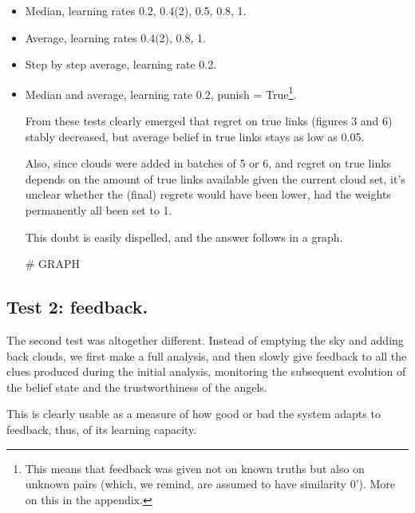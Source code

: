 \documentclass[11pt]{article}
\begin{document}
\begin{itemize}
\item Median, learning rates 0.2, 0.4(2), 0.5, 0.8, 1.

\item Average, learning rates 0.4(2), 0.8, 1.

\item Step by step average, learning rate 0.2.

\item Median and average, learning rate 0.2, punish = True\footnote{This means that feedback was given not on known truths but also on unknown pairs (which, we remind, are assumed to have similarity $0$'). More on this in the appendix.}.

From these tests clearly emerged that regret on true links (figures 3 and 6) stably decreased, but average belief in true links stays as low as 0.05.

Also, since clouds were added in batches of 5 or 6, and regret on true links depends on the amount of true links available given the current cloud set, it's unclear whether the (final) regrets would have been lower, had the weights permanently all been set to 1.

This doubt is easily dispelled, and the answer follows in a graph. 

\# GRAPH



\end{itemize}









\subsection{Test 2: feedback.}

The second test was altogether different. Instead of emptying the sky and adding back clouds, we first make a full analysis, and then slowly give feedback to all the clues produced during the initial analysis, monitoring the subsequent evolution of the belief state and the trustworthiness of the angels.

This is clearly usable as a measure of how good or bad the system adapts to feedback, thus, of its learning capacity.
\end{document}
